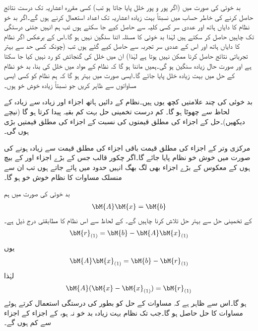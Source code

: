 بد خوئی کی صورت میں (اگر پور و پور خلل پایا جاتا ہو تب) کسی مقررہ اعشاریہ تک درست نتائج حاصل کرنے کی خاطر حساب میں نسبتاً بہت زیادہ اعشاریہ تک اعداد استعمال کرنے ہوں گے۔اگر بد خو نظام کا دایاں ہاتھ اور  عددی سر کسی کلیہ سے حاصل کیے جا سکتے ہوں تب ہم انہیں جتنی درستگی تک  چاہیں حاصل کر سکتے ہیں لہٰذا بد خوئی کا مسئلہ اتنا سنگین نہیں ہو گا۔اس کے برعکس اگر نظام کا دایاں ہاتھ اور اس کے عددی سر تجربہ سے حاصل کیے گئے ہوں تب (چونکہ کسی حد سے بہتر تجرباتی نتائج حاصل کرنا ممکن نہیں ہوتا ہے لہٰذا)   ان میں خلل کی گنجائش کو رد نہیں کیا جا سکتا ہے  اور صورت حال زیادہ سنگین ہو گی۔ہمیں ماننا  ہو گا کہ نظام کے مواد میں خلل کی بنا، بد خو نظام کے حل میں بہت زیادہ خلل پایا جائے گا۔ایسی صورت میں بہتر ہو گا کہ ہم نظام کو کسی ایسی مساواتوں سے ظاہر کریں جو نسبتاً زیادہ خوش خو ہوں۔

بد خوئی کی چند علامتیں کچھ یوں ہیں۔نظام کے دائیں ہاتھ اجزاء اور زیادہ سے زیادہ  کے لحاظ سے  چھوٹا ہو گا۔ کم درست تخمینی حل بہت کم  بقیہ پیدا کرتا ہو گا (نیچے دیکھیں)۔حل کے اجزاء کی مطلق قیمتوں کی نسبت  کے اجزاء کی مطلق قیمتیں بڑی ہوں گی۔ 

مرکزی وتر کے اجزاء کی مطلق قیمت باقی اجزاء کی مطلق قیمت سے زیادہ ہونے کی صورت میں خوش خو نظام پایا جائے گا۔اگر چکور قالب جس کے بڑے اجزاء  اور  کے بیچ ہوں کے معکوس کے بڑے اجزاء بھی لگ بھگ انہیں حدود میں پائے جاتے ہوں تب ان سے منسلک مساوات کا نظام خوش خو ہو گا۔ 

بد خوئی کی صورت میں ہم
\begin{align}\label{مساوات_خطی_اعدادی_نظام_بقیہ_الف}
\bM{A}\bM{x}=\bM{b}
\end{align}
کے تخمینی حل  سے  بہتر حل تلاش کرنا چاہیں گے۔  کے لحاظ سے اس نظام کا مطابقتی  درج ذیل ہے۔ 
\begin{align*}
\bM{r}_{(1)}=\bM{b}-\bM{A}\bM{x}_{(1)}
\end{align*}
یوں 
\begin{align*}
\bM{A}\bM{x}_{(1)}=\bM{b}-\bM{r}_{(1)}
\end{align*}
لہٰذا
\begin{align}\label{مساوات_خطی_اعدادی_نظام_بقیہ_ب}
\bM{A}(\bM{x}-\bM{x}_{(1)})=\bM{r}_{(1)}
\end{align}
ہو گا۔اس سے ظاہر ہے کہ مساوات  کے حل کو بطور   کی درستگی استعمال کرتے ہوئے مساوات  کا حل حاصل ہو گا۔جب تک نظام بہت زیادہ بد خو نہ ہو،  کے اجزاء  کے اجزاء سے کم ہوں گے۔

